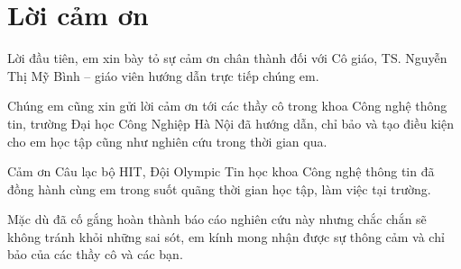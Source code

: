 \documentclass[envcountsame,envcountchap, openany, 14pt]{mysvmono2}
\begin{document}
\frontmatter%
\mainmatter%


\section*{\centering Lời cảm ơn}

Lời đầu tiên, em xin bày tỏ sự cảm ơn chân thành đối với Cô giáo, TS.
Nguyễn Thị Mỹ Bình – giáo viên hướng dẫn trực tiếp chúng em.

Chúng em cũng xin gửi lời cảm ơn tới các thầy cô trong khoa Công nghệ thông tin,
trường Đại học Công Nghiệp Hà Nội đã hướng dẫn, chỉ bảo và tạo điều kiện cho em
học tập cũng như nghiên cứu trong thời gian qua.

Cảm ơn Câu lạc bộ HIT, Đội Olympic Tin học khoa Công nghệ thông tin đã đồng hành
cùng em trong suốt quãng thời gian học tập, làm việc tại trường.

Mặc dù đã cố gắng hoàn thành báo cáo nghiên cứu này nhưng chắc chắn
sẽ không tránh khỏi những sai sót, em kính mong nhận được sự thông cảm và chỉ
bảo của các thầy cô và các bạn.

\tableofcontents







% 

\backmatter%
\medskip



\end{document}
